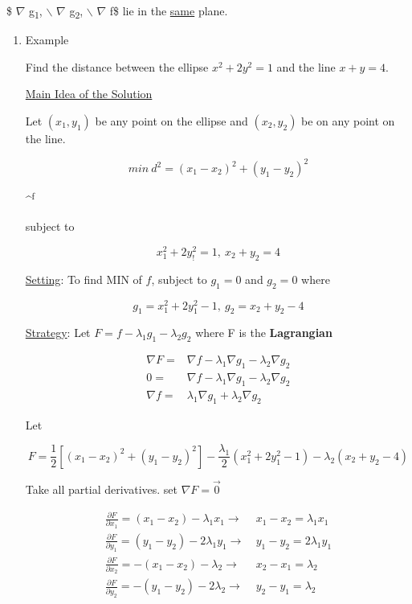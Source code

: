 \documentclass[11pt]{article}
\begin{document}
\$ \(\nabla\) g\textsubscript{1}, $\backslash$ \(\nabla\) g\textsubscript{2}, $\backslash$ \(\nabla\) f\$ lie in the \uline{same} plane.

\begin{enumerate}
\item Example
\label{sec:org583598c}

Find the distance between the ellipse \(x^2 + 2 y^2 = 1\) and the line \(x + y =
4\).

\uline{Main Idea of the Solution}

Let \((x_1, y_1)\) be any point on the ellipse and \((x_2, y_2)\) be on any point on
the line.

$$
min \ d^2 = (x_1 - x_2)^2 + (y_1 - y_2)^2
$$

\^{}\textsuperscript{f}

subject to

$$x_1^2 + 2y_!^2 = 1, \ x_2 + y_2 = 4$$

\uline{Setting}: To find MIN of \(f\), subject to \(g_1 = 0\) and \(g_2 = 0\) where

$$
g_1 = x_1^2 + 2y_1^2 - 1, \ g_2 = x_2 + y_2 - 4
$$


\uline{Strategy}: Let \(F = f - \lambda_1 g_1 - \lambda_2 g_2\) where F is the
\textbf{Lagrangian}

\begin{equation}
\begin{split}
\nabla F = & \nabla f - \lambda_1 \nabla g_1 - \lambda_2 \nabla g_2\\
0 = & \nabla f - \lambda_1 \nabla g_1 - \lambda_2 \nabla g_2\\
\nabla f = & \lambda_1 \nabla g_1 + \lambda_2 \nabla g_2
\end{split}
\end{equation}

Let

$$
F = \frac{1}{2} [(x_1 - x_2)^2 + (y_1 - y_2)^2] - \frac{\lambda_1}{2}(x_1^2 + 2
y_1^2 - 1) - \lambda_2 (x_2 + y_2 - 4)
$$

Take all partial derivatives. set \(\nabla F = \vec 0\)

\begin{subequations}
\label{first:two}
\begin{align}
\frac{\partial F}{\partial x_1} = (x_1 - x_2)  - \lambda_1 x_1 \to & \ x_1 - x_2 = \lambda_1 x_1\\
\frac{\partial F}{\partial y_1} = (y_1 - y_2) - 2 \lambda_1 y_1 \to & \ y_1 - y_2 = 2 \lambda_1 y_1\\
\frac{\partial F}{\partial x_2} = -(x_1 - x_2) - \lambda_2 \to & \ x_2 - x_1 = \lambda_2\\
\frac{\partial F}{\partial y_2} = - (y_1 - y_2) - 2 \lambda_2 \to & \ y_2 - y_1 = \lambda_2\\
\end{align}
\end{subequations}


\end{enumerate}
\end{document}
